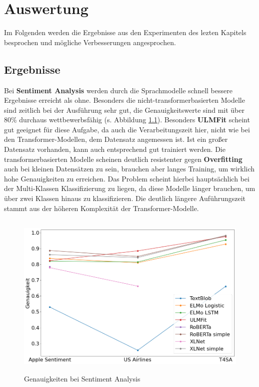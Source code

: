 \chapter{Auswertung}
Im Folgenden werden die Ergebnisse aus den Experimenten des lezten Kapitels besprochen und m\"ogliche Verbesserungen angesprochen.

\section{Ergebnisse}
Bei \textbf{Sentiment Analysis} werden durch die Sprachmodelle schnell bessere Ergebnisse erreicht als ohne. Besonders die nicht-transformerbasierten Modelle sind zeitlich bei der Ausf\"uhrung sehr gut, die Genauigkeitswerte sind mit \"uber 80\% durchaus wettbewerbsf\"ahig (s. Abbildung \ref{fig:acc_sentiment}). Besonders \textbf{ULMFit} scheint gut geeignet f\"ur diese Aufgabe, da auch die Verarbeitungszeit hier, nicht wie bei den Transformer-Modellen, dem Datensatz angemessen ist. Ist ein gro{\ss}er Datensatz vorhanden, kann auch entsprechend gut trainiert werden. Die transformerbasierten Modelle scheinen deutlich resistenter gegen \textbf{Overfitting} auch bei kleinen Datens\"atzen zu sein, brauchen aber langes Training, um wirklich hohe Genauigkeiten zu erreichen. Das Problem scheint hierbei haupts\"achlich bei der Multi-Klassen Klassifizierung zu liegen, da diese Modelle l\"anger brauchen, um \"uber zwei Klassen hinaus zu klassifizieren. Die deutlich l\"angere Auf\"uhrungszeit stammt aus der h\"oheren Komplexit\"at der Transformer-Modelle.\\
\begin{figure}[!ht]
\centering
\includegraphics[height=8cm]{pics/accuracies_sentiment.png}
\caption{Genauigkeiten bei Sentiment Analysis}
\label{fig:acc_sentiment}
\end{figure}
